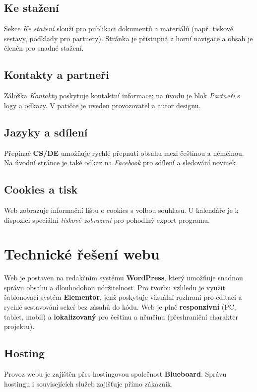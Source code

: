 \documentclass[12pt,a4paper]{article}
\begin{document}
	\subsection{Ke stažení}
	Sekce \emph{Ke stažení} slouží pro publikaci dokumentů a materiálů (např. tiskové
	sestavy, podklady pro partnery). Stránka je přístupná z horní navigace a obsah
	je členěn pro snadné stažení.
	
	\subsection{Kontakty a partneři}
	Záložka \emph{Kontakty} poskytuje kontaktní informace; na úvodu je blok
	\emph{Partneři} s logy a odkazy. V patičce je uveden provozovatel a autor designu.
	
	\subsection{Jazyky a sdílení}
	Přepínač \textbf{CS/DE} umožňuje rychlé přepnutí obsahu mezi češtinou a němčinou.
	Na úvodní stránce je také odkaz na \emph{Facebook} pro sdílení a sledování novinek.
	
	\subsection{Cookies a tisk}
	Web zobrazuje informační lištu o cookies s volbou souhlasu.
	U kalendáře je k dispozici speciální \emph{tiskové zobrazení} pro pohodlný export programu.
	
	\newpage
	\section{Technické řešení webu}
	Web je postaven na redakčním systému \textbf{WordPress}, který umožňuje snadnou
	správu obsahu a dlouhodobou udržitelnost. Pro tvorbu vzhledu je využit
	šablonovací systém \textbf{Elementor}, jenž poskytuje vizuální rozhraní pro editaci
	a rychlé sestavování sekcí bez zásahů do kódu. Web je plně \textbf{responzivní}
	(PC, tablet, mobil) a \textbf{lokalizovaný} pro češtinu a němčinu
	(přeshraniční charakter projektu).
	
	\subsection*{Hosting}
	Provoz webu je zajištěn přes hostingovou společnost \textbf{Blueboard}.
	Správu hostingu i souvisejících služeb zajišťuje přímo zákazník.
	
\end{document}
